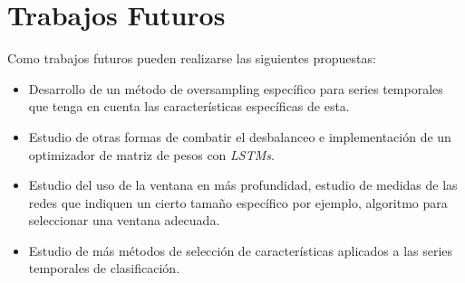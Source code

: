 \section{Trabajos Futuros}
Como trabajos futuros pueden realizarse las siguientes propuestas:
\begin{itemize}
	\item Desarrollo de un método de oversampling específico para series temporales que tenga en cuenta las características específicas de esta.
	\item Estudio de otras formas de combatir el desbalanceo e implementación de un optimizador de matriz de pesos con \textit{LSTMs}.
	\item Estudio del uso de la ventana en más profundidad, estudio de medidas de las redes que indiquen un cierto tamaño específico por ejemplo, algoritmo para seleccionar una ventana adecuada.
	\item Estudio de más métodos de selección de características aplicados a las series temporales de clasificación.
\end{itemize}